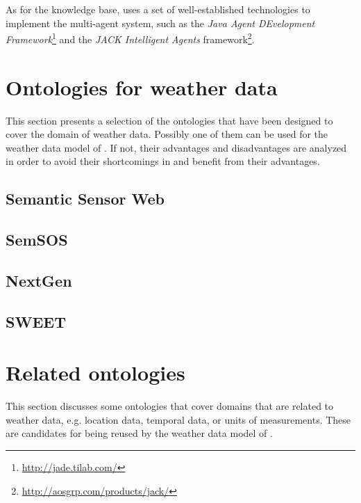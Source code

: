As for the knowledge base, \thinkhome uses a set of well-established technologies to implement the multi-agent system, such as the \emph{Java Agent DEvelopment Framework}\footnote{\href{http://jade.tilab.com/}{http://jade.tilab.com/}} and the \emph{JACK Intelligent Agents} framework\footnote{\href{http://aosgrp.com/products/jack/}{http://aosgrp.com/products/jack/}}.

\section{Ontologies for weather data}
\label{sec:weather_ontologies}

This section presents a selection of the ontologies that have been designed to cover the domain of weather data. Possibly one of them can be used for the weather data model of \thinkhome. If not, their advantages and disadvantages are analyzed in order to avoid their shortcomings in \thinkhome and benefit from their advantages.


\subsection{Semantic Sensor Web}


\subsection{SemSOS}


\subsection{NextGen}


\subsection{SWEET}


\section{Related ontologies}
\label{sec:related_ontologies}

This section discusses some ontologies that cover domains that are related to weather data, e.g. location data, temporal data, or units of measurements. These are candidates for being reused by the weather data model of \thinkhome.

